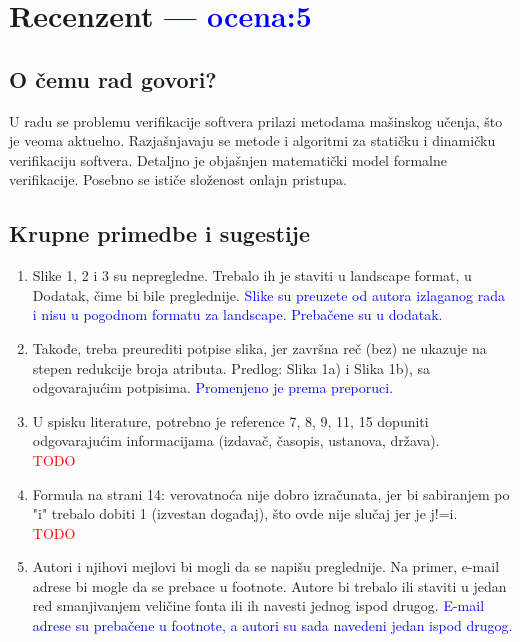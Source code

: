 \documentclass[a4paper]{report}
\newcommand{\odgovor}[1]{\textcolor{blue}{#1}}
\newcommand{\todo}[1]{\textcolor{red}{#1}}
\begin{document}
\chapter{Recenzent \odgovor{--- ocena:5} }

\section{O čemu rad govori?}

U radu se problemu verifikacije softvera prilazi metodama mašinskog učenja, što je veoma aktuelno.
Razjašnjavaju se metode i algoritmi za statičku i dinamičku verifikaciju softvera.
Detaljno je objašnjen matematički model formalne verifikacije.
Posebno se ističe složenost onlajn pristupa.

\section{Krupne primedbe i sugestije}

\begin{enumerate}
\item Slike 1, 2 i 3 su nepregledne.
Trebalo ih je staviti u landscape format, u Dodatak, čime bi bile preglednije.
\odgovor{Slike su preuzete od autora izlaganog rada i nisu u pogodnom formatu za landscape. Prebačene su u dodatak.}

\item Takođe, treba preurediti potpise slika,
jer završna reč (bez) ne ukazuje na stepen redukcije broja atributa.
Predlog:
Slika 1a) i Slika 1b), sa odgovarajućim potpisima.
\odgovor{Promenjeno je prema preporuci.}

\item U spisku literature, potrebno je reference 7, 8, 9, 11, 15
dopuniti odgovarajućim informacijama (izdavač, časopis, ustanova, država).
\\\todo{TODO}

\item Formula na strani 14: verovatnoća nije dobro izračunata,
jer bi sabiranjem po "i" trebalo dobiti 1 (izvestan događaj), što ovde nije slučaj jer je j!=i.
\\\todo{TODO}

\item Autori i njihovi mejlovi bi mogli da se napišu preglednije.
Na primer, e-mail adrese bi mogle da se prebace u footnote.
Autore bi trebalo ili staviti u jedan red smanjivanjem veličine fonta
ili ih navesti jednog ispod drugog.
\odgovor{E-mail adrese su prebačene u footnote, a autori su sada navedeni jedan ispod drugog.}
\end{enumerate}
\end{document}
